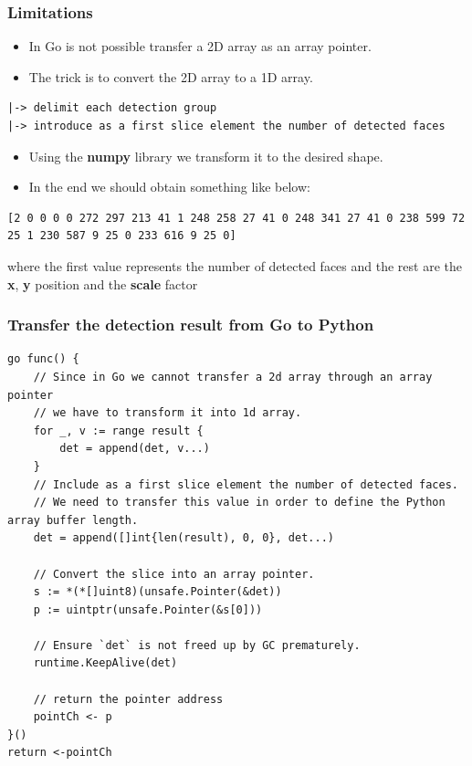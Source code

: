 \documentclass[9pt]{beamer}
\begin{document}
\begin{frame}[fragile]
\frametitle{Limitations}


\begin{itemize}
\item In Go is not possible transfer a 2D array as an array pointer.
\item The trick is to convert the 2D array to a 1D array.
\end{itemize}


\begin{verbatim}
|-> delimit each detection group
|-> introduce as a first slice element the number of detected faces

\end{verbatim}


\begin{itemize}
\item Using the \textbf{numpy} library we transform it to the desired shape.
\item In the end we should obtain something like below:
\end{itemize}


\begin{verbatim}
[2 0 0 0 0 272 297 213 41 1 248 258 27 41 0 248 341 27 41 0 238 599 72 25 1 230 587 9 25 0 233 616 9 25 0]

\end{verbatim}


where the first value represents the number of detected faces and the rest are the \textbf{x}, \textbf{y} position and the \textbf{scale} factor



\end{frame}

\begin{frame}[fragile]
\frametitle{Transfer the detection result from Go to Python}



\begin{verbatim}
go func() {
    // Since in Go we cannot transfer a 2d array through an array pointer
    // we have to transform it into 1d array.
    for _, v := range result {
        det = append(det, v...)
    }
    // Include as a first slice element the number of detected faces.
    // We need to transfer this value in order to define the Python array buffer length.
    det = append([]int{len(result), 0, 0}, det...)

    // Convert the slice into an array pointer.
    s := *(*[]uint8)(unsafe.Pointer(&det))
    p := uintptr(unsafe.Pointer(&s[0]))

    // Ensure `det` is not freed up by GC prematurely.
    runtime.KeepAlive(det)

    // return the pointer address
    pointCh <- p
}()
return <-pointCh

\end{verbatim}



\end{frame}
\end{document}

